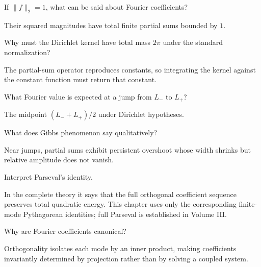 \begin{problem}\label{prob:ii14-problem-07}
If $\|f\|_2=1$, what can be said about Fourier coefficients?
\end{problem}
\begin{solution}
Their squared magnitudes have total finite partial sums bounded by $1$.
\end{solution}

\begin{problem}\label{prob:ii14-problem-08}
Why must the Dirichlet kernel have total mass $2\pi$ under the standard normalization?
\end{problem}
\begin{solution}
The partial-sum operator reproduces constants, so integrating the kernel against the constant function must return that constant.
\end{solution}

\begin{problem}\label{prob:ii14-problem-09}
What Fourier value is expected at a jump from $L_-$ to $L_+$?
\end{problem}
\begin{solution}
The midpoint $(L_-+L_+)/2$ under Dirichlet hypotheses.
\end{solution}

\begin{problem}\label{prob:ii14-problem-10}
What does Gibbs phenomenon say qualitatively?
\end{problem}
\begin{solution}
Near jumps, partial sums exhibit persistent overshoot whose width shrinks but relative amplitude does not vanish.
\end{solution}

\begin{problem}\label{prob:ii14-problem-11}
Interpret Parseval's identity.
\end{problem}
\begin{solution}
In the complete theory it says that the full orthogonal coefficient sequence preserves total quadratic energy. This chapter uses only the corresponding finite-mode Pythagorean identities; full Parseval is established in Volume III.
\end{solution}

\begin{problem}\label{prob:ii14-problem-12}
Why are Fourier coefficients canonical?
\end{problem}
\begin{solution}
Orthogonality isolates each mode by an inner product, making coefficients invariantly determined by projection rather than by solving a coupled system.
\end{solution}

